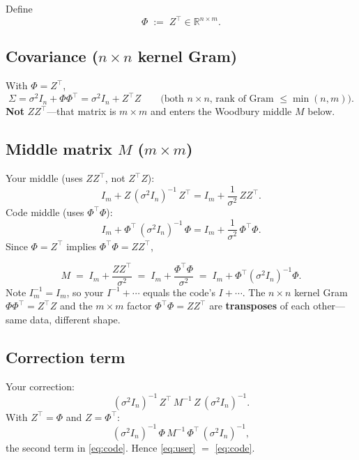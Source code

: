 \documentclass[11pt]{article}
\newcommand{\noise}{\sigma^2}
\newcommand{\Sig}{\Sigma}
\newcommand{\Ph}{\Phi}
\newcommand{\Zmat}{Z}
\begin{document}
Define
\begin{equation}
  \Ph \;:=\; \Zmat^{\top} \in \mathbb{R}^{n\times m}.
\end{equation}

\subsection{Covariance ($n\times n$ kernel Gram)}

\begin{samebox}
With $\Ph=\Zmat^{\top}$,
\[
  \Sig
  = \noise I_n + \Ph\Ph^{\top}
  = \noise I_n + \Zmat^{\top}\Zmat
  \qquad\text{(both $n\times n$, rank of Gram $\le \min(n,m)$).}
\]
\textbf{Not} $\Zmat\Zmat^{\top}$---that matrix is $m\times m$ and enters the Woodbury middle $M$ below.
\end{samebox}

\subsection{Middle matrix $M$ ($m\times m$)}

Your middle (uses $\Zmat\Zmat^{\top}$, not $\Zmat^{\top}\Zmat$):
\[
  I_m + \Zmat\,(\noise I_n)^{-1}\,\Zmat^{\top}
  = I_m + \frac{1}{\noise}\,\Zmat\Zmat^{\top}.
\]
Code middle (uses $\Ph^{\top}\Ph$):
\[
  I_m + \Ph^{\top}\,(\noise I_n)^{-1}\,\Ph
  = I_m + \frac{1}{\noise}\,\Ph^{\top}\Ph.
\]
Since $\Ph=\Zmat^{\top}$ implies $\Ph^{\top}\Ph = \Zmat\Zmat^{\top}$,
\begin{samebox}
\[
  \boxed{M \;=\; I_m + \frac{\Zmat\Zmat^{\top}}{\noise}
       \;=\; I_m + \frac{\Ph^{\top}\Ph}{\noise}
       \;=\; I_m + \Ph^{\top}(\noise I_n)^{-1}\Ph.}
\]
Note $I_m^{-1}=I_m$, so your $I^{-1}+\cdots$ equals the code's $I+\cdots$.
The $n\times n$ kernel Gram $\Ph\Ph^{\top}=\Zmat^{\top}\Zmat$ and the $m\times m$ factor $\Ph^{\top}\Ph=\Zmat\Zmat^{\top}$ are \textbf{transposes} of each other---same data, different shape.
\end{samebox}

\subsection{Correction term}

Your correction:
\[
  (\noise I_n)^{-1}\,\Zmat^{\top}\,M^{-1}\,\Zmat\,(\noise I_n)^{-1}.
\]
With $\Zmat^{\top}=\Ph$ and $\Zmat=\Ph^{\top}$:
\[
  (\noise I_n)^{-1}\,\Ph\,M^{-1}\,\Ph^{\top}\,(\noise I_n)^{-1},
\]
the second term in \eqref{eq:code}. Hence \eqref{eq:user} $=$ \eqref{eq:code}.
\end{document}
